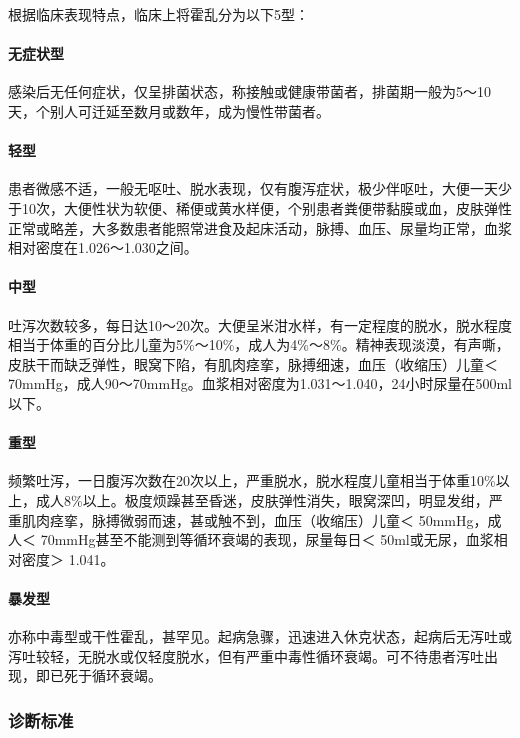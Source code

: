 根据临床表现特点，临床上将霍乱分为以下5型：

\paragraph{无症状型}

感染后无任何症状，仅呈排菌状态，称接触或健康带菌者，排菌期一般为5～10天，个别人可迁延至数月或数年，成为慢性带菌者。

\paragraph{轻型}

患者微感不适，一般无呕吐、脱水表现，仅有腹泻症状，极少伴呕吐，大便一天少于10次，大便性状为软便、稀便或黄水样便，个别患者粪便带黏膜或血，皮肤弹性正常或略差，大多数患者能照常进食及起床活动，脉搏、血压、尿量均正常，血浆相对密度在1.026～1.030之间。

\paragraph{中型}

吐泻次数较多，每日达10～20次。大便呈米泔水样，有一定程度的脱水，脱水程度相当于体重的百分比儿童为5\%～10\%，成人为4\%～8\%。精神表现淡漠，有声嘶，皮肤干而缺乏弹性，眼窝下陷，有肌肉痉挛，脉搏细速，血压（收缩压）儿童＜
70mmHg，成人90～70mmHg。血浆相对密度为1.031～1.040，24小时尿量在500ml以下。

\paragraph{重型}

频繁吐泻，一日腹泻次数在20次以上，严重脱水，脱水程度儿童相当于体重10\%以上，成人8\%以上。极度烦躁甚至昏迷，皮肤弹性消失，眼窝深凹，明显发绀，严重肌肉痉挛，脉搏微弱而速，甚或触不到，血压（收缩压）儿童＜
50mmHg，成人＜ 70mmHg甚至不能测到等循环衰竭的表现，尿量每日＜
50ml或无尿，血浆相对密度＞ 1.041。

\paragraph{暴发型}

亦称中毒型或干性霍乱，甚罕见。起病急骤，迅速进入休克状态，起病后无泻吐或泻吐较轻，无脱水或仅轻度脱水，但有严重中毒性循环衰竭。可不待患者泻吐出现，即已死于循环衰竭。

\subsubsection{诊断标准}

